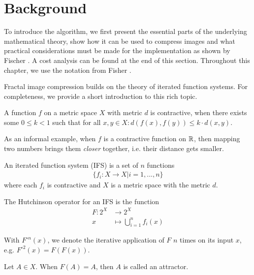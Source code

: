 \section{Background}\label{sec:background}

To introduce the algorithm, we first present the essential parts of the
underlying mathematical theory, show how it can be used to compress images and
what practical considerations must be made for the implementation as shown by
Fischer \cite{fisher2012}. A cost analysis can be found at the end of this
section. Throughout this chapter, we use the notation from Fisher
\cite{fisher2012}.

 Fractal image compression builds on the
theory of iterated function systems. For completeness, we provide a short
introduction to this rich topic.

\begin{definition}
    A function $f$ on a metric space $X$ with metric $d$ is contractive, when there exists some $0 \leq k < 1$
    such that for all $x,y \in X: d(f(x), f(y)) \leq k \cdot d(x,y)$.
\end{definition}

As an informal example, when $f$ is a contractive function on $\mathbb{R}$, then mapping
two numbers brings them \textit{closer} together, i.e. their distance gets
smaller.

\begin{definition}
  An iterated function system (IFS) is a set of $n$ functions
  \begin{align*}
    \{f_i:X \to X | i=1,...,n\}
  \end{align*}
  where each $f_i$ is contractive and $X$ is a metric space with the metric $d$.
\end{definition}

\begin{definition}
    The Hutchinson operator for an IFS is the function
    \begin{align*}
        F \colon 2^X &\to 2^X\\
        x &\mapsto \bigcup_{i=1}^n f_i(x)
    \end{align*}
\end{definition}

With $F^{\circ n}(x)$, we denote the iterative application of $F$ $n$ times on
its input $x$, e.g. $F^{\circ 2}(x) = F(F(x))$.

\begin{definition}
    Let $A \in X$. When $F(A)=A$, then $A$ is called an attractor.
\end{definition}


